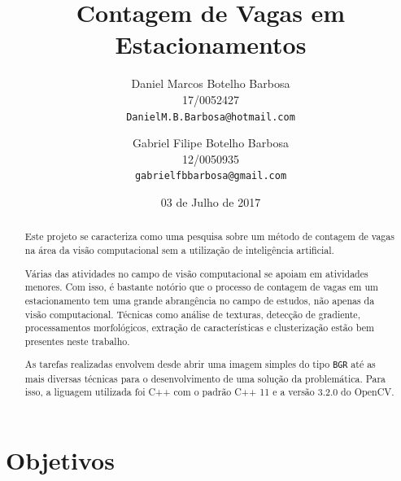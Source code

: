 \documentclass[10pt,twocolumn,letterpaper]{article}
\begin{document}
\title{Contagem de Vagas em Estacionamentos}

\date{03 de Julho de 2017}

\author{Daniel Marcos Botelho Barbosa\\
17/0052427\\
{\tt\small DanielM.B.Barbosa@hotmail.com}\\
\and
Gabriel Filipe Botelho Barbosa\\
12/0050935\\
{\tt\small gabrielfbbarbosa@gmail.com}
}

\maketitle






\begin{abstract}
	Este projeto se caracteriza como uma pesquisa sobre um método de contagem
de vagas na área da visão computacional sem a utilização de inteligência artificial.

	Várias das atividades no campo de visão computacional se apoiam em atividades
menores. Com isso, é bastante notório que o processo de contagem de vagas em um
estacionamento tem uma grande abrangência no campo de estudos, não apenas da
visão computacional. Técnicas como análise de texturas, detecção de gradiente,
processamentos morfológicos, extração
de características e clusterização estão bem presentes neste trabalho.

	As tarefas realizadas envolvem desde abrir uma imagem simples do tipo \verb'BGR'
até as mais diversas técnicas para o desenvolvimento de uma solução da problemática.
Para isso, a liguagem utilizada foi C++ com o padrão C++ 11 e a versão 3.2.0 do OpenCV.\\
\end{abstract}





\section{Objetivos}
\end{document}
